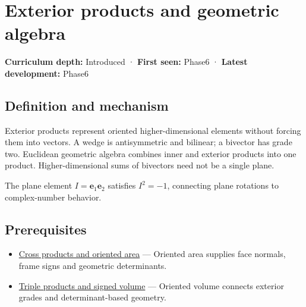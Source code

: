 \hypertarget{appendix-e1960925d1b8}{}\label{referencestart:appendix-e1960925d1b8}
\section{Exterior products and geometric algebra}\label{appendix-e1960925d1b8-exterior-products-and-geometric-algebra}

\hypertarget{appendix-e1960925d1b8-exterior-products-and-geometric-algebra}{}

\textbf{Curriculum depth:} Introduced · \textbf{First seen:} Phase6 · \textbf{Latest development:} Phase6

\begin{allmightroledefinition}

\subsection{Definition and mechanism}\label{appendix-e1960925d1b8-definition-and-mechanism}

\hypertarget{appendix-e1960925d1b8-definition-and-mechanism}{}

Exterior products represent oriented higher-dimensional elements without forcing them into vectors. A wedge is antisymmetric and bilinear; a bivector has grade two. Euclidean geometric algebra combines inner and exterior products into one product. Higher-dimensional sums of bivectors need not be a single plane.

\end{allmightroledefinition}

The plane element \(I=\mathbf e_1\mathbf e_2\) satisfies \(I^2=-1\), connecting plane rotations to complex-number behavior.

\subsection{Prerequisites}\label{appendix-e1960925d1b8-prerequisites}

\hypertarget{appendix-e1960925d1b8-prerequisites}{}

\begin{itemize}
\tightlist
\item
  \hyperref[appendix-2391db8052b1]{Cross products and oriented area} --- Oriented area supplies face normals, frame signs and geometric determinants.
\item
  \hyperref[appendix-5caa058bd9c7]{Triple products and signed volume} --- Oriented volume connects exterior grades and determinant-based geometry.
\end{itemize}

